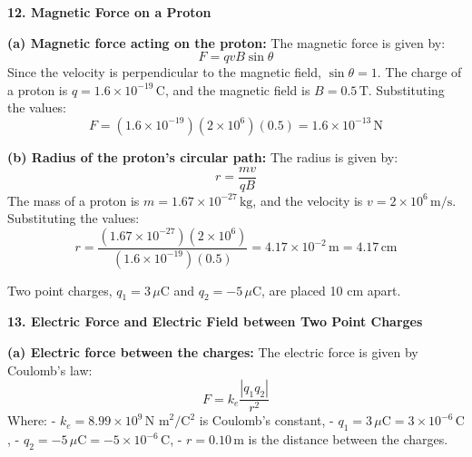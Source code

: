 \documentclass[addpoints]{exam}
\begin{document}
\begin{questions}
\begin{solution}[8cm]
\textbf{12. Magnetic Force on a Proton}

\textbf{(a) Magnetic force acting on the proton:}  
The magnetic force is given by:
\[
F = q v B \sin \theta
\]
Since the velocity is perpendicular to the magnetic field, \(\sin \theta = 1\). The charge of a proton is \(q = 1.6 \times 10^{-19} \, \text{C}\), and the magnetic field is \(B = 0.5 \, \text{T}\). Substituting the values:
\[
F = (1.6 \times 10^{-19}) (2 \times 10^6) (0.5) = 1.6 \times 10^{-13} \, \text{N}
\]

\textbf{(b) Radius of the proton’s circular path:}  
The radius is given by:
\[
r = \frac{mv}{qB}
\]
The mass of a proton is \(m = 1.67 \times 10^{-27} \, \text{kg}\), and the velocity is \(v = 2 \times 10^6 \, \text{m/s}\). Substituting the values:
\[
r = \frac{(1.67 \times 10^{-27}) (2 \times 10^6)}{(1.6 \times 10^{-19})(0.5)} = 4.17 \times 10^{-2} \, \text{m} = 4.17 \, \text{cm}
\]
\end{solution}



\question Two point charges, \(q_1 = 3 \, \mu\text{C}\) and \(q_2 = -5 \, \mu\text{C}\), are placed 10 cm apart.
\begin{solution}[8cm]
\textbf{13. Electric Force and Electric Field between Two Point Charges}

\textbf{(a) Electric force between the charges:}  
The electric force is given by Coulomb's law:
\[
F = k_e \frac{|q_1 q_2|}{r^2}
\]
Where:
- \( k_e = 8.99 \times 10^9 \, \text{N m}^2 / \text{C}^2 \) is Coulomb's constant,
- \( q_1 = 3 \, \mu\text{C} = 3 \times 10^{-6} \, \text{C} \),
- \( q_2 = -5 \, \mu\text{C} = -5 \times 10^{-6} \, \text{C} \),
- \( r = 0.10 \, \text{m} \) is the distance between the charges.


\end{solution}
\end{questions}
\end{document}
